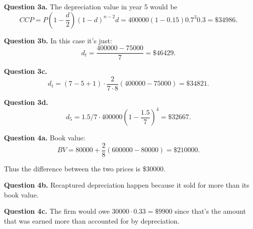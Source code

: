 \documentclass[letterpaper, reqno,11pt]{article}
\begin{document}
{\noindent\bf Question 3a.} The depreciation value in year 5 would be 
\[
CCP=P (1-\frac{d}{2})(1-d)^{n-2}d=400000 (1-0.15)0.7^{3}0.3=\$34986
.\]

{\noindent\bf Question 3b.} In this case it's just: 
\[
d_t=\frac{400000-75000}{7}=\$46429
.\]

{\noindent\bf Question 3c.} 
\[
d_t=(7-5+1)\cdot \frac{2}{7\cdot 8}(400000-75000)=\$34821
.\]

{\noindent\bf Question 3d.} 
\[
d_5=1.5/7 \cdot 400000 \left( 1-\frac{1.5}{7} \right)^{4}=\$32667
.\]

{\noindent\bf Question 4a.} Book value: 
\[
BV=80000 + \frac{2}{8}\left( 600000-80000 \right) =\$210000
.\]

Thus the difference between the two prices is \$30000. 

{\noindent\bf Question 4b.} Recaptured depreciation happen because it sold for more than its book value. 

{\noindent\bf Question 4c.} The firm would owe $30000\cdot 0.33=\$9900$ since that's the amount that was earned more than accounted for by depreciation. 
\end{document}
